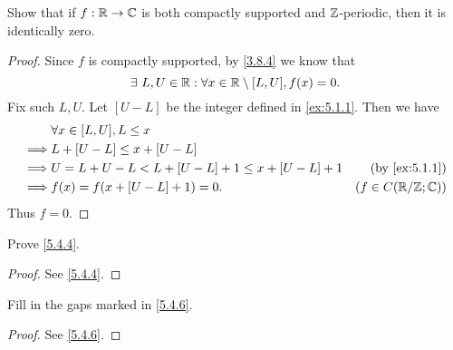 \exercisesection

\begin{ex}\label{ex:5.4.1}
  Show that if \(f : \mathbb{R} \to \mathbb{C}\) is both compactly supported and \(\mathbb{Z}\)-periodic, then it is identically zero.
\end{ex}

\begin{proof}
  Since \(f\) is compactly supported, by \cref{3.8.4} we know that
  \[
    \exists\ L, U \in \mathbb{R} : \forall x \in \mathbb{R} \setminus [L, U], f(x) = 0.
  \]
  Fix such \(L, U\).
  Let \([U - L]\) be the integer defined in \cref{ex:5.1.1}.
  Then we have
  \begin{align*}
             & \forall x \in [L, U], L \leq x                                                     \\
    \implies & L + [U - L] \leq x + [U - L]                                                       \\
    \implies & U = L + U - L < L + [U - L] + 1 \leq x + [U - L] + 1 & \text{(by \cref{ex:5.1.1})} \\
    \implies & f(x) = f(x + [U - L] + 1) = 0.                       & (f \in C(\R / \Z ; \C))
  \end{align*}
  Thus \(f = 0\).
\end{proof}

\begin{ex}\label{ex:5.4.2}
  Prove \cref{5.4.4}.
\end{ex}

\begin{proof}
  See \cref{5.4.4}.
\end{proof}

\begin{ex}\label{ex:5.4.3}
  Fill in the gaps marked in \cref{5.4.6}.
\end{ex}

\begin{proof}
  See \cref{5.4.6}.
\end{proof}